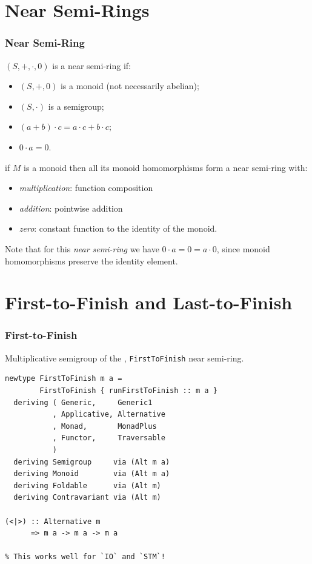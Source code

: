 \documentclass[t,dvipsnames,hyperref={colorlinks,citecolor=NavyBlue,linkcolor=NavyBlue,anchorcolor=NavyBlue,urlcolor=NavyBlue}]{beamer}
\begin{document}
\section{Near Semi-Rings}
\begin{frame}
  \frametitle{Near Semi-Ring}
  \begin{definition}
    \((S, +, \cdot, 0)\) is a near semi-ring if:
    \begin{itemize}
      \item[\bullet] \((S, +, 0)\) is a monoid (not necessarily abelian);
      \item[\bullet] \((S, \cdot)\) is a semigroup;
      \item[\bullet] \((a + b) \cdot c = a \cdot c + b \cdot c\);
      \item[\bullet] \(0 \cdot a = 0\).
    \end{itemize}
  \end{definition}
  \begin{example}\small
    if \(M\) is a monoid then all its monoid homomorphisms form a near semi-ring
    with:
    \begin{itemize}
      \item[\bullet] \textit{multiplication}: function composition
      \item[\bullet] \textit{addition}: pointwise addition
      \item[\bullet] \textit{zero}: constant function to the identity of the monoid.
    \end{itemize}
    Note that for this \textit{near semi-ring} we have \(0\cdot a = 0 = a \cdot 0\),
    since monoid homomorphisms preserve the identity element.
  \end{example}
\end{frame}

\section{First-to-Finish and Last-to-Finish}

\begin{frame}[fragile]
  \frametitle{First-to-Finish}
  Multiplicative semigroup of the , \texttt{FirstToFinish} near semi-ring.
  \begin{verbatim}
newtype FirstToFinish m a =
        FirstToFinish { runFirstToFinish :: m a }
  deriving ( Generic,     Generic1
           , Applicative, Alternative
           , Monad,       MonadPlus
           , Functor,     Traversable
           )
  deriving Semigroup     via (Alt m a)
  deriving Monoid        via (Alt m a)
  deriving Foldable      via (Alt m)
  deriving Contravariant via (Alt m)

(<|>) :: Alternative m
      => m a -> m a -> m a

% This works well for `IO` and `STM`!
  \end{verbatim}
\end{frame}
\end{document}
